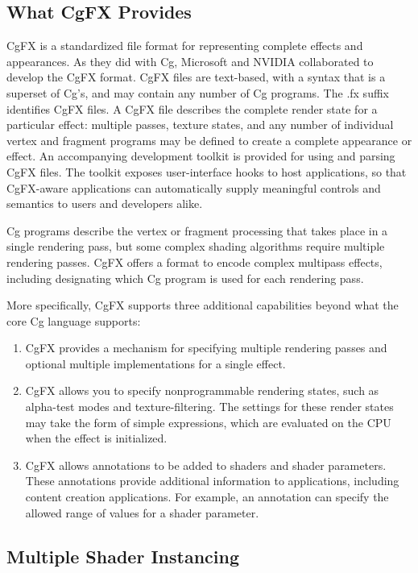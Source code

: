 \documentclass[../main.tex]{subfiles}
\begin{document}
\subsection*{What CgFX Provides}

CgFX is a standardized file format for representing complete effects and appearances. As they did with Cg, Microsoft and NVIDIA collaborated to develop the CgFX format. CgFX files are text-based, with a syntax that is a superset of Cg's, and may contain any number of Cg programs. The .fx suffix identifies CgFX files. A CgFX file describes the complete render state for a particular effect: multiple passes, texture states, and any number of individual vertex and fragment programs may be defined to create a complete appearance or effect. An accompanying development toolkit is provided for using and parsing CgFX files. The toolkit exposes user-interface hooks to host applications, so that CgFX-aware applications can automatically supply meaningful controls and semantics to users and developers alike.

Cg programs describe the vertex or fragment processing that takes place in a single rendering pass, but some complex shading algorithms require multiple rendering passes. CgFX offers a format to encode complex multipass effects, including designating which Cg program is used for each rendering pass.

More specifically, CgFX supports three additional capabilities beyond what the core Cg language supports:

\FloatBarrier
\begin{enumerate}
\item CgFX provides a mechanism for specifying multiple rendering passes and optional multiple implementations for a single effect.
\item CgFX allows you to specify nonprogrammable rendering states, such as alpha-test modes and texture-filtering. The settings for these render states may take the form of simple expressions, which are evaluated on the CPU when the effect is initialized.
\item CgFX allows annotations to be added to shaders and shader parameters. These annotations provide additional information to applications, including content creation applications. For example, an annotation can specify the allowed range of values for a shader parameter.
\end{enumerate}
\FloatBarrier

\subsection*{Multiple Shader Instancing}
\end{document}
